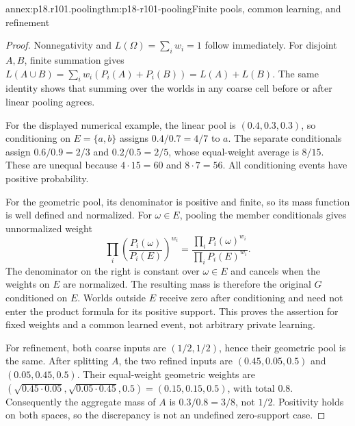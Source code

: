 \begin{annexitem}{annex:p18.r101.pooling}{thm:p18-r101-pooling}{Finite pools, common learning, and refinement}
\begin{proof}
Nonnegativity and \(L(\Omega)=\sum_iw_i=1\) follow immediately.
For disjoint \(A,B\), finite summation gives
\(L(A\cup B)=\sum_iw_i(P_i(A)+P_i(B))=L(A)+L(B)\).
The same identity shows that summing over the worlds in any coarse cell
before or after linear pooling agrees.

For the displayed numerical example, the linear pool is
\((0.4,0.3,0.3)\), so conditioning on \(E=\{a,b\}\) assigns
\(0.4/0.7=4/7\) to \(a\). The separate conditionals assign
\(0.6/0.9=2/3\) and \(0.2/0.5=2/5\), whose equal-weight average
is \(8/15\). These are unequal because \(4\cdot15=60\) and
\(8\cdot7=56\). All conditioning events have positive probability.

For the geometric pool, its denominator is positive and finite, so its
mass function is well defined and normalized. For \(\omega\in E\),
pooling the member conditionals gives unnormalized weight
\[
 \prod_i\left(\frac{P_i(\omega)}{P_i(E)}\right)^{w_i}
 =\frac{\prod_iP_i(\omega)^{w_i}}{\prod_iP_i(E)^{w_i}}.
\]
The denominator on the right is constant over \(\omega\in E\) and
cancels when the weights on \(E\) are normalized. The resulting mass
is therefore the original \(G\) conditioned on \(E\). Worlds outside
\(E\) receive zero after conditioning and need not enter the product
formula for its positive support. This proves the assertion for fixed
weights and a common learned event, not arbitrary private learning.

For refinement, both coarse inputs are \((1/2,1/2)\), hence their
geometric pool is the same. After splitting \(A\), the two refined
inputs are \((0.45,0.05,0.5)\) and \((0.05,0.45,0.5)\).
Their equal-weight geometric weights are
\((\sqrt{0.45\cdot0.05},\sqrt{0.05\cdot0.45},0.5)
=(0.15,0.15,0.5)\), with total \(0.8\). Consequently the aggregate
mass of \(A\) is \(0.3/0.8=3/8\), not \(1/2\). Positivity holds
on both spaces, so the discrepancy is not an undefined zero-support case.
\end{proof}
\end{annexitem}


